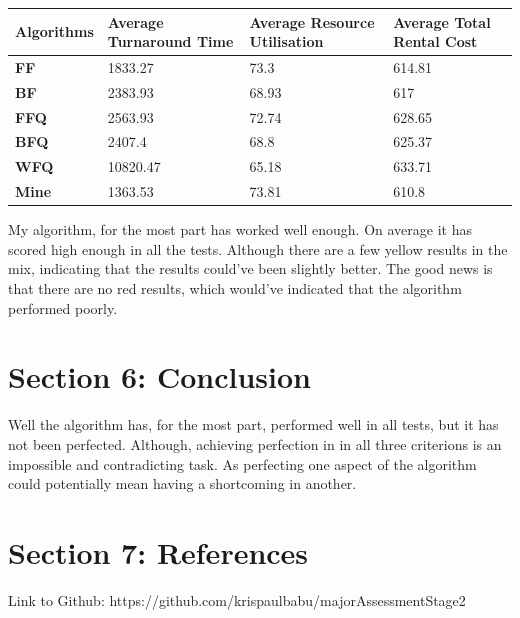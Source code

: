 \documentclass[a4paper]{article} %
\begin{document}
\begin{table}[!ht]
    \centering
    \begin{tabular}{|l|l|l|l|}
    \hline
        \textbf{Algorithms} & \textbf{Average Turnaround Time} & \textbf{Average Resource Utilisation} & \textbf{Average Total Rental Cost} \\ \hline
        \textbf{FF} & 1833.27 & 73.3 & 614.81 \\ \hline
        \textbf{BF} & 2383.93 & 68.93 & 617 \\ \hline
        \textbf{FFQ} & 2563.93 & 72.74 & 628.65 \\ \hline
        \textbf{BFQ} & 2407.4 & 68.8 & 625.37 \\ \hline
        \textbf{WFQ} & 10820.47 & 65.18 & 633.71 \\ \hline
        \textbf{Mine} & 1363.53 & 73.81 & 610.8 \\ \hline
    \end{tabular}
\end{table}

My algorithm, for the most part has worked well enough. On average it has scored high enough in all the tests. Although there are 
a few yellow results in the mix, indicating that the results could've been slightly better. The good news is that there are no 
red results, which would've indicated that the algorithm performed poorly. \\

\section*{Section 6: Conclusion}\label{sec:section6}
Well the algorithm has, for the most part, performed well in all tests, but it has not been perfected. Although, achieving perfection in
in all three criterions is an impossible and contradicting task. As perfecting one aspect of the algorithm could potentially mean 
having a shortcoming in another. 

\section*{Section 7: References}\label{sec:section7}

Link to Github: https://github.com/krispaulbabu/majorAssessmentStage2
\end{document}
